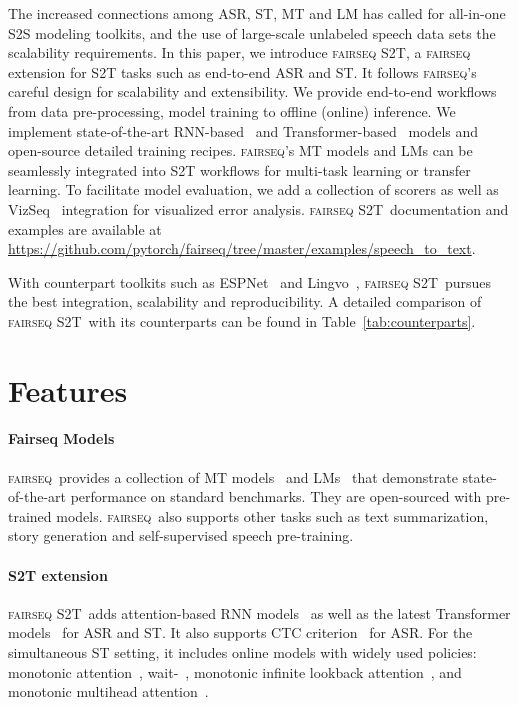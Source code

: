 \documentclass[11pt,a4paper]{article}
\newcommand{\fairseq}{\textsc{fairseq}}
\newcommand{\stot}{\textsc{fairseq S2T}}
\begin{document}
The increased connections among ASR, ST, MT and LM has called for all-in-one S2S modeling toolkits, and the use of large-scale unlabeled speech data sets the scalability requirements. In this paper, we introduce \stot, a \fairseq~\citep{ott2019fairseq} extension for S2T tasks such as end-to-end ASR and ST. It follows \fairseq's careful design for scalability and extensibility. We provide end-to-end workflows from data pre-processing, model training to offline (online) inference. We implement state-of-the-art RNN-based~\citep{chan2016listen,berard2018end} and Transformer-based~\citep{vaswani2017attention,Mohamed2019TransformersWC} models and open-source detailed training recipes. \fairseq's MT models and LMs can be seamlessly integrated into S2T workflows for multi-task learning or transfer learning. To facilitate model evaluation, we add a collection of scorers as well as VizSeq~\citep{wang-etal-2019-vizseq} integration for visualized error analysis. \stot~documentation and examples are available at \url{https://github.com/pytorch/fairseq/tree/master/examples/speech_to_text}.

With counterpart toolkits such as ESPNet~\citep{inaguma-etal-2020-espnet} and Lingvo~\citep{shen2019lingvo}, \stot~pursues the best integration, scalability and reproducibility. A detailed comparison of \stot~with its counterparts can be found in Table~\ref{tab:counterparts}.


\section{Features}

\paragraph{Fairseq Models} \fairseq~provides a collection of MT models~\citep{ng-etal-2019-facebook,lewis2019bart} and LMs~\citep{liu2019roberta,conneau2019unsupervised} that demonstrate state-of-the-art performance on standard benchmarks. They are open-sourced with pre-trained models. \fairseq~also supports other tasks such as text summarization, story generation and self-supervised speech pre-training.

\paragraph{S2T extension} \stot~adds attention-based RNN models~\cite{chan2016listen,berard2018end} as well as the latest Transformer models~\citep{vaswani2017attention,Mohamed2019TransformersWC} for ASR and ST. It also supports CTC criterion~\citep{graves2006connectionist} for ASR. For the simultaneous ST setting, it includes online models with widely used policies: monotonic attention~\citep{raffel2017online}, wait-~\citep{Ma2018STACLST},
monotonic infinite lookback attention~\citep{arivazhagan2019monotonic},
and monotonic multihead attention~\citep{ma2019monotonic}.
\end{document}
